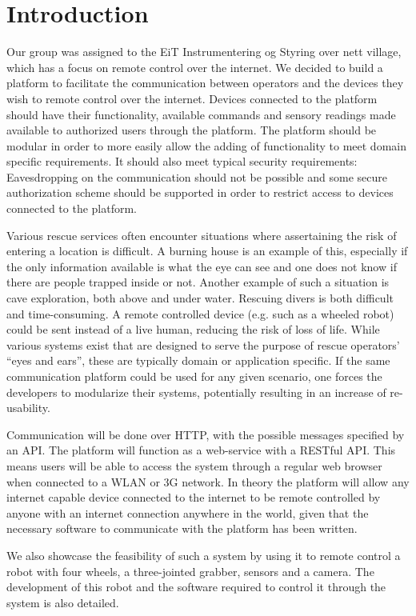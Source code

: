 \chapter{Introduction}
Our group was assigned to the EiT Instrumentering og Styring over nett village, which has a focus on remote control over the internet.
We decided to build a platform to facilitate the communication between operators and the devices they wish to remote control over the internet.
Devices connected to the platform should have their functionality, available commands and sensory readings made available to authorized users through the platform.
The platform should be modular in order to more easily allow the adding of functionality to meet domain specific requirements.
It should also meet typical security requirements: Eavesdropping on the communication should not be possible and some secure authorization scheme should be supported in order to restrict access to devices connected to the platform.

Various rescue services often encounter situations where assertaining the risk of entering a location is difficult. A burning house is an example of this, especially if the only information available is what the eye can see and one does not know if there are people trapped inside or not.
Another example of such a situation is cave exploration, both above and under water.
Rescuing divers is both difficult and time-consuming.  %
A remote controlled device (e.g. such as a wheeled robot) could be sent instead of a live human, reducing the risk of loss of life.
While various systems exist that are designed to serve the purpose of rescue operators' ``eyes and ears'', these are typically domain or application specific.
If the same communication platform could be used for any given scenario, one forces the developers to modularize their systems, potentially resulting in an increase of re-usability.


Communication will be done over HTTP, with the possible messages specified by an API.
The platform will function as a web-service with a RESTful API. %
This means users will be able to access the system through a regular web browser when connected to a WLAN or 3G network.
In theory the platform will allow any internet capable device connected to the internet to be remote controlled by anyone with an internet connection anywhere in the world, given that the necessary software to communicate with the platform has been written.

We also showcase the feasibility of such a system by using it to remote control a robot with four wheels, a three-jointed grabber, sensors and a camera.
The development of this robot and the software required to control it through the system is also detailed.
